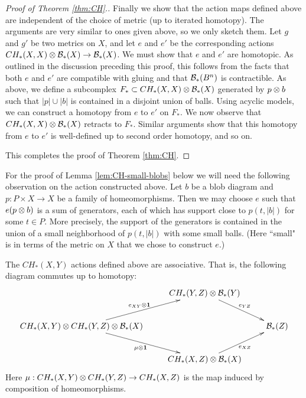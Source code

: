 {\begin{proof}[Proof of Theorem \ref{thm:CH}.]
Finally we show that the action maps defined above are independent of
the choice of metric (up to iterated homotopy).
The arguments are very similar to ones given above, so we only sketch them.
Let $g$ and $g'$ be two metrics on $X$, and let $e$ and $e'$ be the corresponding
actions $CH_*(X, X) \otimes {\mathcal B}_*(X)\to{\mathcal B}_*(X)$.
We must show that $e$ and $e'$ are homotopic.
As outlined in the discussion preceding this proof,
this follows from the facts that both $e$ and $e'$ are compatible
with gluing and that ${\mathcal B}_*(B^n)$ is contractible.
As above, we define a subcomplex $F_*\subset  CH_*(X, X) \otimes {\mathcal B}_*(X)$ generated
by $p\otimes b$ such that $|p|\cup|b|$ is contained in a disjoint union of balls.
Using acyclic models, we can construct a homotopy from $e$ to $e'$ on $F_*$.
We now observe that $CH_*(X, X) \otimes {\mathcal B}_*(X)$ retracts to $F_*$.
Similar arguments show that this homotopy from $e$ to $e'$ is well-defined
up to second order homotopy, and so on.

This completes the proof of Theorem \ref{thm:CH}.
\end{proof}


\begin{rem*}
\label{rem:for-small-blobs}
For the proof of Lemma \ref{lem:CH-small-blobs} below we will need the following observation on the action constructed above.
Let $b$ be a blob diagram and $p:P\times X\to X$ be a family of homeomorphisms.
Then we may choose $e$ such that $e(p\otimes b)$ is a sum of generators, each
of which has support close to $p(t,|b|)$ for some $t\in P$.
More precisely, the support of the generators is contained in the union of a small neighborhood
of $p(t,|b|)$ with some small balls.
(Here ``small" is in terms of the metric on $X$ that we chose to construct $e$.)
\end{rem*}


\begin{thm}
\label{thm:CH-associativity}
The $CH_*(X, Y)$ actions defined above are associative.
That is, the following diagram commutes up to homotopy:
\[ \xymatrix{
& CH_*(Y, Z) \ot \bc_*(Y) \ar[dr]^{e_{YZ}} & \\
CH_*(X, Y) \ot CH_*(Y, Z) \ot \bc_*(X) \ar[ur]^{e_{XY}\ot\id} \ar[dr]_{\mu\ot\id} & & \bc_*(Z) \\
& CH_*(X, Z) \ot \bc_*(X) \ar[ur]_{e_{XZ}} &
} \]
Here $\mu:CH_*(X, Y) \otimes CH_*(Y, Z)\to CH_*(X, Z)$ is the map induced by composition
of homeomorphisms.
\end{thm}

}
